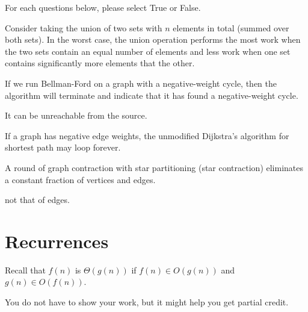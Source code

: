 \begin{problem}[10.][Miscellaneous]

For each questions below, please select True or False.

\asktf

Consider taking the union of two sets with $n$ elements in total
(summed over both sets).  In the worst case, the union operation
performs the most work when the two sets contain an equal number of
elements and less work when one set contains significantly more
elements that the other.

\solt



\asktf

If we run Bellman-Ford on a graph with a negative-weight cycle, then
the algorithm will terminate and indicate that it has found a
negative-weight cycle.

\solf
It can be unreachable from the source.

\asktf

If a graph has negative edge weights, the unmodified Dijkstra's
algorithm for shortest path may loop forever.

\solf

\asktf 

A round of graph contraction with star partitioning (star contraction)
eliminates a constant fraction of vertices and edges.

\solf
not that of edges.

\end{problem}

\section{Recurrences}

Recall that $f(n)$ is $\Theta(g(n))$
if $f(n) \in O(g(n))$ and $g(n) \in O(f(n))$.


\begin{note}
You do not have to show your work, but it might help you get partial credit.
\end{note}

